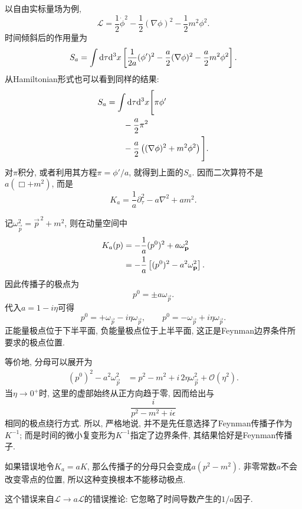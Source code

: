 \begin{example}
    以自由实标量场为例,
    \begin{equation}
        \mathcal L
        =\frac12\dot\phi^2-\frac12(\nabla\phi)^2-\frac12m^2\phi^2.
    \end{equation}
    时间倾斜后的作用量为
    \begin{equation}
        S_a=\int\d\tau\d^3x\left[
        \frac1{2a}(\phi')^2
        -\frac a2(\nabla\phi)^2
        -\frac a2m^2\phi^2
        \right].
    \end{equation}
    从Hamiltonian形式也可以看到同样的结果:
    \begin{align}
        S_a
        &=\int\d\tau\d^3x\Bigg[
        \pi\phi'\notag\\
        &\hspace{2em}
        -\frac a2\pi^2\notag\\
        &\hspace{2em}
        -\frac a2\left((\nabla\phi)^2+m^2\phi^2\right)\Bigg].
    \end{align}
    对$\pi$积分, 或者利用其方程$\pi=\phi'/a$, 就得到上面的$S_a$. 因而二次算符不是$a(\Box+m^2)$, 而是
    \begin{equation}
        K_a=\frac1a\partial_\tau^2-a\nabla^2+am^2.
    \end{equation}

    记$\omega_{\vec p}^2=\vec p^{\,2}+m^2$, 则在动量空间中
    \begin{align}
        K_a(p)
        &=-\frac1a(p^0)^2+a\omega_{\vec p}^2\notag\\
        &=-\frac1a\left[(p^0)^2-a^2\omega_{\vec p}^2\right].
    \end{align}
    因此传播子的极点为
    \begin{equation}
        p^0=\pm a\omega_{\vec p}.
    \end{equation}
    代入$a=1-i\eta$可得
    \begin{equation}
        p^0=+\omega_{\vec p}-i\eta\omega_{\vec p},
        \qquad
        p^0=-\omega_{\vec p}+i\eta\omega_{\vec p}.
    \end{equation}
    正能量极点位于下半平面, 负能量极点位于上半平面, 这正是Feynman边界条件所要求的极点位置.

    等价地, 分母可以展开为
    \begin{align}
        (p^0)^2-a^2\omega_{\vec p}^2
        &=p^2-m^2+i\,2\eta\omega_{\vec p}^2+\mathcal O(\eta^2).
    \end{align}
    当$\eta\to0^+$时, 这里的虚部始终从正方向趋于零, 因而给出与
    \begin{equation}
        \frac{i}{p^2-m^2+i\epsilon}
    \end{equation}
    相同的极点绕行方式. 所以, 严格地说, 并不是先任意选择了Feynman传播子作为$K^{-1}$; 而是时间的微小复变形为$K^{-1}$指定了边界条件, 其结果恰好是Feynman传播子.

    如果错误地令$K_a=aK$, 那么传播子的分母只会变成$a(p^2-m^2)$. 非零常数$a$不会改变零点的位置, 所以这种变换根本不能移动极点.

    这个错误来自$\mathcal L\to a\mathcal L$的错误推论: 它忽略了时间导数产生的$1/a$因子.
\end{example}

